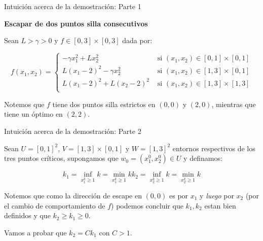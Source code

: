 \documentclass{beamer}
\begin{document}
\begin{frame}{Intuici\'on acerca de la demostraci\'on: Parte 1}

\textbf{Escapar de dos puntos silla consecutivos}

\bigskip
\pause

	Sean $L > \gamma > 0$ y $f \in [0,3] \times [0,3]$ dada por:
	
	\begin{equation*}
	f(x_1, x_2) = \left\lbrace \begin{array}{cc}
	- \gamma x_1^2 + Lx_2^2 & \text{ si } (x_1,x_2) \in [0,1] \times [0,1] \\
	L \left(x_1 - 2\right)^2 - \gamma x_2^2 & \text{ si } (x_1,x_2) \in [1,3] \times [0,1] \\
	L \left(x_1 - 2\right)^2 + L \left(x_2 - 2\right)^2 & \text{ si } (x_1,x_2) \in [1,3] \times [1,3] \\
	\end{array} \right.
	\end{equation*}
	
	\pause
	\bigskip
	
	Notemos que $f$ tiene dos puntos silla estrictos en $(0,0)$ y $(2,0)$, mientras que tiene un \'optimo en $(2,2)$. 
	
\end{frame}
\begin{frame}{Intuici\'on acerca de la demostraci\'on: Parte 2}
	
	Sean $U = [0,1]^2$, $V= [1,3] \times [0,1]$ y $W = [1,3]^2$ entornos respectivos de los tres puntos cr\'iticos, supongamos que $w_0 = \left(x^0_1, x^0_2\right) \in U$ y definamos:
	
	\begin{subequations}
		\begin{equation*}
		k_1 = \inf\limits_{x^k_1 \geq 1}{k} = \min\limits_{x^k_1 \geq 1}{k}
		\end{equation*}
		\begin{equation*}
		k_2 = \inf\limits_{x^k_2 \geq 1}{k} = \min\limits_{x^k_2 \geq 1}{k}
		\end{equation*}
	\end{subequations}
	
	\pause
	\bigskip
	
	Notemos que como la direcci\'on de escape en $(0,0)$ es por $x_1$ y \textit{luego} por $x_2$ (por el cambio de comportamiento de $f$) podemos concluir que $k_1,k_2$ estan bien definidos y que $k_2 \geq k_1 \geq 0$.
	
	\medskip
	Vamos a probar que $k_2 = Ck_1$ con $C>1$.
	
\end{frame}
\end{document}
